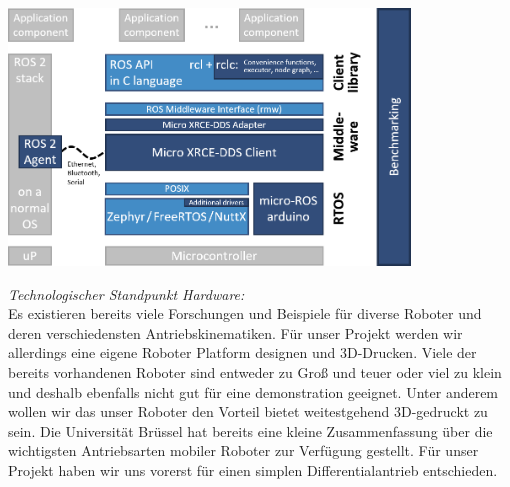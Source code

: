 \begin{flushleft}
\begin{description}
        \includegraphics[width=0.8\textwidth]{imgs/Grundbegriffe/micro-ROS_architecture.png}
        \label{fig:micro-ros-architecture}%
            
    \end{description}
\end{flushleft}

\begin{flushleft}
    \textit{Technologischer Standpunkt Hardware:} \\
    Es existieren bereits viele Forschungen und Beispiele für diverse Roboter
    und deren verschiedensten Antriebskinematiken.
    Für unser Projekt werden wir allerdings eine eigene Roboter Platform designen und 3D-Drucken.
    Viele der bereits vorhandenen Roboter sind entweder zu Groß und teuer oder viel zu klein und deshalb ebenfalls nicht 
    gut für eine demonstration geeignet. Unter anderem wollen wir das unser Roboter den Vorteil bietet weitestgehend
    3D-gedruckt zu sein.
    Die Universität Brüssel \cite{brussel_kristof_goris} hat bereits eine kleine Zusammenfassung über die wichtigsten Antriebsarten mobiler Roboter zur Verfügung gestellt.
    Für unser Projekt haben wir uns vorerst für einen simplen Differentialantrieb entschieden. 
\end{flushleft}